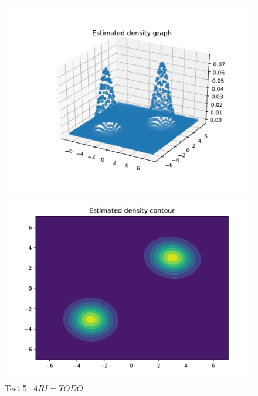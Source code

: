 \begin{figure}[h]
	\centering
	\begin{minipage}{0.5\textwidth}
		\includegraphics[scale=0.4]{etc/test5_dens.pdf}
	\end{minipage}%
	\begin{minipage}{0.5\textwidth}
		\includegraphics[scale=0.4]{etc/test5_cont.pdf}
	\end{minipage}
	\captionsetup{labelformat=empty}
	\caption{Test 5. $ARI = TODO$}
\end{figure}
